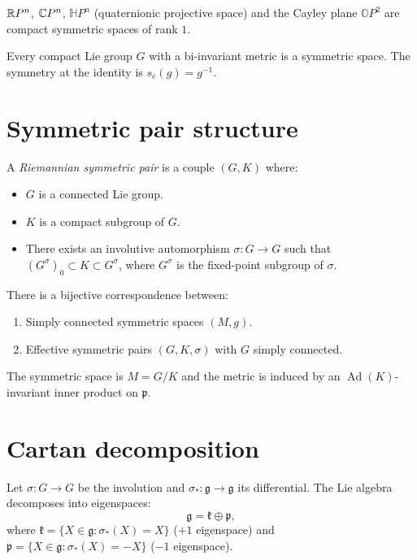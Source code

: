 \begin{example}
$\mathbb{R} P^n$, $\mathbb{C} P^n$, $\mathbb{H}P^n$ (quaternionic projective space) and the
Cayley plane $\mathbb{O}P^2$ are compact symmetric spaces of rank $1$.
\end{example}

\begin{example}
Every compact Lie group $G$ with a bi-invariant metric is a symmetric space.
The symmetry at the identity is $s_e(g) = g^{-1}$.
\end{example}

\section{Symmetric pair structure}

\begin{definition}
A \emph{Riemannian symmetric pair} is a couple $(G, K)$ where:
\begin{itemize}
    \item $G$ is a connected Lie group.
    \item $K$ is a compact subgroup of $G$.
    \item There exists an involutive automorphism $\sigma : G \to G$ such that
          $(G^\sigma)_0 \subset K \subset G^\sigma$, where $G^\sigma$ is the
          fixed-point subgroup of $\sigma$.
\end{itemize}
\end{definition}

\begin{theorem}
There is a bijective correspondence between:
\begin{enumerate}
    \item Simply connected symmetric spaces $(M, g)$.
    \item Effective symmetric pairs $(G, K, \sigma)$ with $G$ simply connected.
\end{enumerate}
The symmetric space is $M = G/K$ and the metric is induced by an
$\operatorname{Ad}(K)$-invariant inner product on $\mathfrak{p}$.
\end{theorem}

\section{Cartan decomposition}

\begin{definition}
Let $\sigma : G \to G$ be the involution and $\sigma_* : \mathfrak{g} \to \mathfrak{g}$
its differential. The Lie algebra decomposes into eigenspaces:
\[
    \mathfrak{g} = \mathfrak{k} \oplus \mathfrak{p},
\]
where $\mathfrak{k} = \{X \in \mathfrak{g} : \sigma_*(X) = X\}$ ($+1$ eigenspace)
and $\mathfrak{p} = \{X \in \mathfrak{g} : \sigma_*(X) = -X\}$ ($-1$ eigenspace).
\end{definition}


